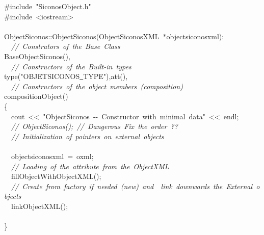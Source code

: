 {\ttfamily \raggedright \small
\#include\ "{}SiconosObject.h"{}\\
\#include\ <{}iostream>{}\\
\ \\
ObjectSiconos::ObjectSiconos(ObjectSiconosXML\ $\ast$objectsiconosxml):\\
\ \ \textsl{//\ Construtors\ of\ the\ Base\ Class}\\
BaseObjectSiconos(),\\
\ \ \textsl{//\ Constructors\ of\ the\ Built-{}in\ types}\\
type("{}OBJETSICONOS\underline\ TYPE"{}),att(),\\
\ \ \textsl{//\ Constructors\ of\ the\ object\ members\ (composition)}\\
compositionObject()\\
\{\\
\ \ cout\ <{}<{}\ "{}ObjectSiconos\ -{}-{}\ Constructor\ with\ minimal\ data"{}\ <{}<{}\ endl;\\
\ \ \textsl{//\ ObjectSiconos();\ //\ Dangerous\ Fix\ the\ order\ ??}\\
\ \ \textsl{//\ Initialization\ of\ pointers\ on\ external\ objects}\\
\ \\
\ \ objectsiconosxml\ =\ oxml;\\
\ \ \textsl{//\ Loading\ of\ the\ attribute\ from\ the\ ObjectXML}\\
\ \ fillObjectWithObjectXML();\\
\ \ \textsl{//\ Create\ from\ factory\ if\ needed\ (new)\ and\ \ link\ downwards\ the\ External\ objects}\\
\ \ linkObjectXML();\\
\ \\
\}\\
\ \\
 }
\normalfont\normalsize

